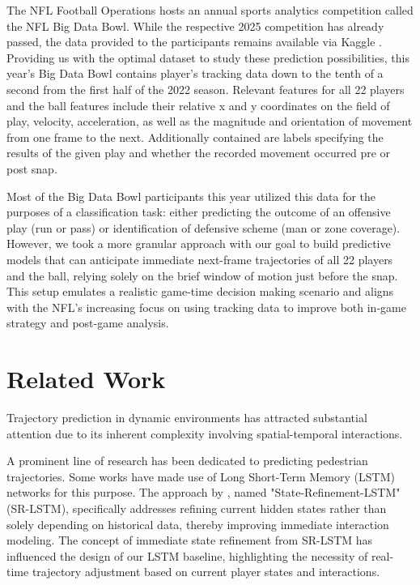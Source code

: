 \documentclass[sigconf]{acmart}
\begin{document}
The NFL Football Operations hosts an annual sports analytics competition called the NFL Big Data Bowl. While the respective 2025 competition has already passed, the data provided to the participants remains available via Kaggle \cite{Lopez2025}. Providing us with the optimal dataset to study these prediction possibilities, this year's Big Data Bowl contains player's tracking data down to the tenth of a second from the first half of the 2022 season. Relevant features for all 22 players and the ball features include their relative x and y coordinates on the field of play, velocity, acceleration, as well as the magnitude and orientation of movement from one frame to the next. Additionally contained are labels specifying the results of the given play and whether the recorded movement occurred pre or post snap. 

Most of the Big Data Bowl participants this year utilized this data for the purposes of a classification task: either predicting the outcome of an offensive play (run or pass) or identification of defensive scheme (man or zone coverage). However, we took a more granular approach with our goal to build predictive models that can anticipate immediate next-frame trajectories of all 22 players and the ball, relying solely on the brief window of motion just before the snap. This setup emulates a realistic game-time decision making scenario and aligns with the NFL's increasing focus on using tracking data to improve both in-game strategy and post-game analysis.

\section{Related Work}

Trajectory prediction in dynamic environments has attracted substantial attention due to its inherent complexity involving spatial-temporal interactions.

A prominent line of research has been dedicated to predicting pedestrian trajectories. Some works have made use of Long Short-Term Memory (LSTM) networks for this purpose. The approach by \cite{Zhang2019}, named "State-Refinement-LSTM" (SR-LSTM), specifically addresses refining current hidden states rather than solely depending on historical data, thereby improving immediate interaction modeling. The concept of immediate state refinement from SR-LSTM has influenced the design of our LSTM baseline, highlighting the necessity of real-time trajectory adjustment based on current player states and interactions.
\end{document}
